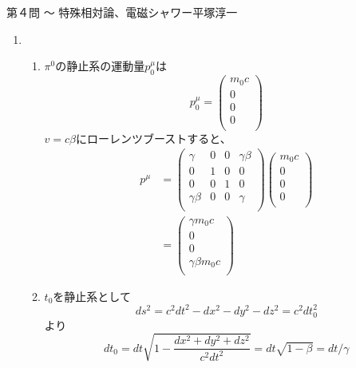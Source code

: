 \begin{answer}{第４問 〜 特殊相対論、電磁シャワー}{平塚淳一}
\begin{enumerate}
\def\<{\langle}
\def\>{\rangle}
\item 
  \begin{enumerate}
  \item $\pi^0$の静止系の運動量$p^{\mu}_0$は
    \begin{equation}
    p^{\mu}_0=\left(
    \begin{array}{c}
    m_0c\\
    0\\
    0\\
    0\\
    \end{array} \right)
    \end{equation}
    $v=c\beta$にローレンツブーストすると、
    \begin{align}
    p^{\mu}&=\left(
    \begin{array}{cccc}
    \gamma & 0 & 0 & \gamma\beta \\
    0 & 1 & 0 & 0 \\
    0 & 0 & 1 & 0 \\
    \gamma\beta & 0 & 0 & \gamma \\
    \end{array} \right)
    \left(
    \begin{array}{c}
    m_0c\\
    0\\
    0\\
    0\\
    \end{array} \right)\\
    &=\left(
    \begin{array}{c}
    \gamma m_0c \\
    0 \\
    0 \\
    \gamma\beta m_0c \\
    \end{array} \right)
    \end{align}
  \item $t_0$を静止系として
    \begin{equation}
    ds^2=c^2dt^2-dx^2-dy^2-dz^2=c^2dt^2_0
    \end{equation}
    より
    \begin{equation}
    dt_0=dt\sqrt{1-\frac{dx^2+dy^2+dz^2}{c^2dt^2}}
    =dt\sqrt{1-\beta}
    =dt/\gamma
    \end{equation}

\end{enumerate}
\end{enumerate}
\end{answer}
